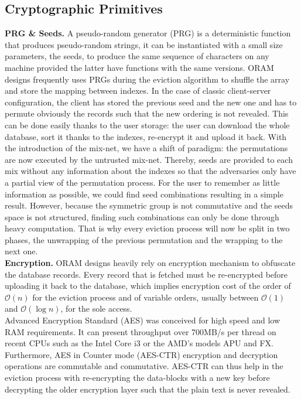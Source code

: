 \documentclass{llncs}
\begin{document}
\subsection{Cryptographic Primitives}
\noindent\textbf{PRG \& Seeds.}
A pseudo-random generator (PRG) is a deterministic function that produces pseudo-random strings, it can be instantiated with a small size parameters, the seeds, to produce the same sequence of characters on any machine provided the latter have functions with the same versions.
ORAM designs frequently uses PRGs during the eviction algorithm to shuffle the array and store the mapping between indexes.
In the case of classic client-server configuration, the client has stored the previous seed and the new one and has to permute obviously the records such that the new ordering is not revealed. This can be done easily thanks to the user storage: the user can download the whole database, sort it thanks to the indexes, re-encrypt it and upload it back.
With the introduction of the mix-net, we have a shift of paradigm: the permutations are now executed by the untrusted mix-net. Thereby, seeds are provided to each mix without any information about the indexes so that the adversaries only have a partial view of the permutation process.
For the user to remember as little information as possible, we could find seed combinations resulting in a simple result. However, because the symmetric group is not commutative and the seeds space is not structured, finding such combinations can only be done through heavy computation.
That is why every eviction process will now be split in two phases, the unwrapping of the previous permutation and the wrapping to the next one.\\

\noindent\textbf{Encryption.}
ORAM designs heavily rely on encryption mechanism to obfuscate the database records. Every record that is fetched must be re-encrypted before uploading it back to the database, 
which implies encryption cost of the order of $\mathcal{O} \left ( n \right )$ for the eviction process and of variable orders, usually between $\mathcal{O} \left ( 1 \right )$ and $\mathcal{O} \left ( \log n \right )$, for the sole access.\\
Advanced Encryption Standard (AES) was conceived for high speed and low RAM requirements. It can present throughput over 700MB/s per thread on recent CPUs such as the Intel Core i3 or the AMD's models APU and FX.
Furthermore, AES in Counter mode (AES-CTR) encryption and decryption operations are commutable and commutative. AES-CTR can thus help in the eviction process with re-encrypting the data-blocks with a new key before decrypting the older encryption layer such that the plain text is never revealed.
\end{document}
